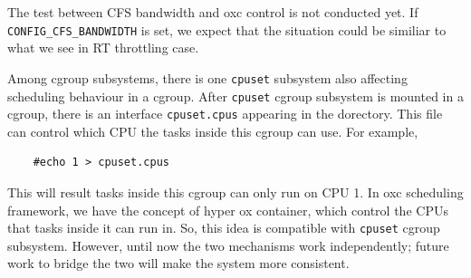 The test between CFS bandwidth and oxc control is not conducted yet.
If \texttt{CONFIG\_CFS\_BANDWIDTH} is set, we expect that the situation 
could be similiar to what we see in RT throttling case.

Among cgroup subsystems, there is one \texttt{cpuset} subsystem also 
affecting scheduling behaviour in a cgroup.
After \texttt{cpuset} cgroup subsystem is mounted in a cgroup, there is an 
interface \texttt{cpuset.cpus} appearing in the dorectory. This file 
can control which CPU the tasks inside this cgroup can use.
For example, 
\begin{lstlisting}
	#echo 1 > cpuset.cpus
\end{lstlisting}
This will result tasks inside this cgroup can only run on CPU 1.
In oxc scheduling framework, we have the concept of hyper ox container, which 
control the CPUs that tasks inside it can run in. So, this idea is
compatible with \texttt{cpuset} cgroup subsystem. However, until now the two
mechanisms work independently; future work to bridge the two will make 
the system more consistent.

